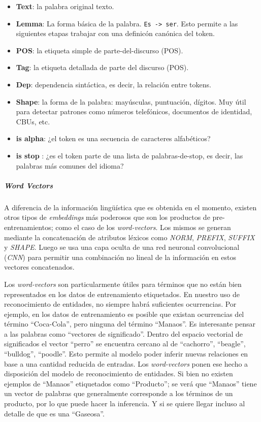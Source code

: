 \documentclass[12pt,a4paper,]{scrartcl}
\providecommand{\tightlist}{%
  \setlength{\itemsep}{0pt}\setlength{\parskip}{0pt}}
\let\oldsubparagraph\subparagraph
\renewcommand{\subparagraph}[1]{\oldsubparagraph{#1}\mbox{}}
\begin{document}
\begin{itemize}
\tightlist
\item
  \textbf{Text}: la palabra original texto.
\item
  \textbf{Lemma}: La forma básica de la palabra. \texttt{Es\ -\textgreater{}\ ser}. Esto permite a las siguientes etapas trabajar con una definicón canónica del token.
\item
  \textbf{POS}: la etiqueta simple de parte-del-discurso (POS).
\item
  \textbf{Tag}: la etiqueta detallada de parte del discurso (POS).
\item
  \textbf{Dep}: dependencia sintáctica, es decir, la relación entre tokens.
\item
  \textbf{Shape}: la forma de la palabra: mayúsculas, puntuación, dígitos. Muy útil para detectar patrones como números telefónicos, documentos de identidad, CBUs, etc.
\item
  \textbf{is alpha}: ¿el token es una secuencia de caracteres alfabéticos?
\item
  \textbf{is stop} : ¿es el token parte de una lista de palabras-de-stop, es decir, las palabras más comunes del idioma?
\end{itemize}

\hypertarget{word-vectors}{%
\subparagraph{\texorpdfstring{\emph{Word Vectors}}{Word Vectors}}\label{word-vectors}}

A diferencia de la información lingüística que es obtenida en el momento, existen otros tipos de \emph{embeddings} más poderosos que son los productos de pre-entrenamientos; como el caso de los \emph{word-vectors}. Los mismos se generan mediante la concatenación de atributos léxicos como \emph{NORM}, \emph{PREFIX}, \emph{SUFFIX} y \emph{SHAPE}. Luego se usa una capa oculta de una red neuronal convolucional (\emph{CNN}) para permitir una combinación no lineal de la información en estos vectores concatenados.

Los \emph{word-vectors} son particularmente útiles para términos que no están bien representados en los datos de entrenamiento etiquetados. En nuestro uso de reconocimiento de entidades, no siempre habrá suficientes ocurrencias. Por ejemplo, en los datos de entrenamiento es posible que existan ocurrencias del término \enquote{Coca-Cola}, pero ninguna del término \enquote{Manaos}.
Es interesante pensar a las palabras como \enquote{vectores de significado}. Dentro del espacio vectorial de significados el vector \enquote{perro} se encuentra cercano al de \enquote{cachorro}, \enquote{beagle}, \enquote{bulldog}, \enquote{poodle}. Esto permite al modelo poder inferir nuevas relaciones en base a una cantidad reducida de entradas.
Los \emph{word-vectors} ponen ese hecho a disposición del modelo de reconocimiento de entidades. Si bien no existen ejemplos de \enquote{Manaos} etiquetados como \enquote{Producto}; se verá que \enquote{Manaos} tiene un vector de palabras que generalmente corresponde a los términos de un producto, por lo que puede hacer la inferencia. Y si se quiere llegar incluso al detalle de que es una \enquote{Gaseosa}.
\end{document}
